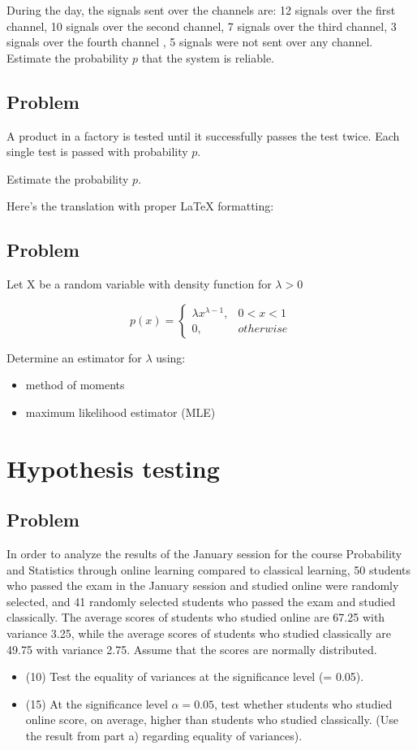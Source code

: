 \documentclass[a4paper, 12pt]{article}
\begin{document}
During the day, the signals sent over the channels are: 12 signals over the first channel, 10 signals over the second channel, 7 signals over the third channel, 3 signals over the fourth channel
, 5 signals were not sent over any channel. \\ 

Estimate the probability $p$ that the system is reliable.

\subsection{Problem}
A product in a factory is tested until it successfully passes the test twice. Each single test is passed with probability $p$.

Estimate the probability $p$.

Here’s the translation with proper LaTeX formatting:


\subsection{Problem}
Let X be a random variable with density function for $\lambda > 0$

\[
p(x) = 
\begin{cases}
\lambda x^{\lambda-1}, & 0 < x < 1 \\
0, & otherwise
\end{cases}  
\]

Determine an estimator for $\lambda$ using:
\begin{itemize}
  \item [a)] method of moments
  \item [b)] maximum likelihood estimator (MLE)
\end{itemize}


\section{Hypothesis testing}


\subsection{Problem}
In order to analyze the results of the January session for the course Probability and Statistics through online learning compared to classical learning, 50 students who passed the exam in the January session and studied online were randomly selected, and 41 randomly selected students who passed the exam and studied classically.
The average scores of students who studied online are 67.25 with variance 3.25, while the average scores of students who studied classically are 49.75 with variance 2.75. Assume that the scores are normally distributed.
\begin{itemize}
  \item [a)] (10) Test the equality of variances at the significance level (\alpha = 0.05).
  \item [b)] (15) At the significance level $\alpha = 0.05$, test whether students who studied online score, on average, higher than students who studied classically. (Use the result from part a) regarding equality of variances).
\end{itemize}
\end{document}
